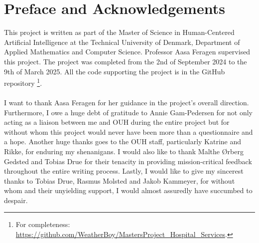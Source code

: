 \section*{Preface and Acknowledgements}
This project is written as part of the Master of Science in Human-Centered Artificial Intelligence at the Technical University of Denmark, Department of Applied Mathematics and Computer Science. Professor Aasa Feragen supervised this project. The project was completed from the 2nd of September 2024 to the 9th of March 2025. All the code supporting the project is in the GitHub repository \footnote{For completeness: \href{https://github.com/WeatherBoy/MastersProject_Hospital_Services}{https://github.com/WeatherBoy/MastersProject\_Hospital\_Services}.}.
\\
\\
I want to thank Aasa Feragen for her guidance in the project's overall direction. Furthermore, I owe a huge debt of gratitude to Annie Gam-Pedersen for not only acting as a liaison between me and OUH during the entire project but for without whom this project would never have been more than a questionnaire and a hope. Another huge thanks goes to the OUH staff, particularly Katrine and Rikke, for enduring my shenanigans.
I would also like to thank Malthe \O rberg Gedsted and Tobias Drue for their tenacity in providing mission-critical feedback throughout the entire writing process.
Lastly, I would like to give my sincerest thanks to Tobias Drue, Rasmus Molsted and Jakob Kammeyer, for without whom and their unyielding support, I would almost assuredly have succumbed to despair.